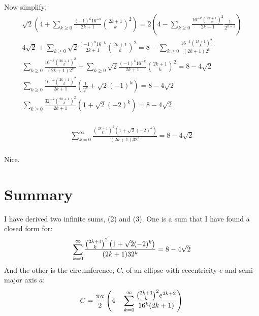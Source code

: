 \documentclass{article}
\begin{document}
Now simplify:
\begin{equation*}
\begin{split}
	\sqrt{2} \left( 4 +
	\sum_{k\geq 0} \frac{(-1)^{k}16^{-k}}{2k+1}{{2k+1}\choose k}^2\right)
	= 2\left(4-\sum_{k\geq 0}\frac{16^{-k}{{2k+1}\choose k}^2}{2k+1}\frac{1}{2^{k+1}}\right)\\
	4\sqrt2 +
	\sum_{k\geq 0} \sqrt2\frac{(-1)^{k}16^{-k}}{2k+1}{{2k+1}\choose k}^2
	= 8-\sum_{k\geq 0}\frac{16^{-k}{{2k+1}\choose k}^2}{(2k+1)2^k}\\
	\sum_{k\geq 0}\frac{16^{-k}{{2k+1}\choose k}^2}{(2k+1)2^k} +
	\sum_{k\geq 0} \sqrt2\frac{(-1)^{k}16^{-k}}{2k+1}{{2k+1}\choose k}^2
	= 8 - 4\sqrt2\\
	\sum_{k\geq 0} \frac{16^{-k}{{2k+1}\choose k}^2}{2k+1} \left(\frac{1}{2^k} +
	\sqrt2(-1)^{k} \right)
	= 8 - 4\sqrt2\\
	\sum_{k\geq 0} \frac{32^{-k}{{2k+1}\choose k}^2}{2k+1} \left(1 +
	\sqrt2(-2)^{k} \right)
	= 8 - 4\sqrt2\\
\end{split}
\end{equation*}
\begin{tcolorbox}
\begin{equation}
\begin{split}
	\sum_{k=0}^{\infty} \frac{{{2k+1}\choose k}^2\left(1+\sqrt2(-2)^{k} \right)}{(2k+1)32^k} 
	= 8 - 4\sqrt2\\
\end{split}
\end{equation}
\end{tcolorbox}
Nice.


\section{Summary}
I have derived two infinite sums, (2) and (3).
One is a sum that I have found a closed form for:
\begin{equation*}
	\sum_{k=0}^{\infty} \frac{{{2k+1}\choose k}^2\left(1+\sqrt2(-2)^{k} \right)}{(2k+1)32^k} 
	= 8 - 4\sqrt2\\
\end{equation*}
And the other is the circumference, $C$, of an ellipse with eccentricity $e$ and semi-major axis $a$:
\begin{equation*}
	C = \frac{\pi a}{2}\left(4-\sum_{k=0}^{\infty}\frac{{{2k+1}\choose k}^2e^{2k+2}}{16^k(2k+1)}\right)\\
\end{equation*}
\end{document}
